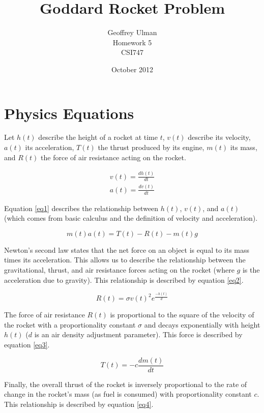 \documentclass{article}
\begin{document}
\title{Goddard Rocket Problem}
\author{Geoffrey Ulman\\
        Homework 5\\
        CSI747}
\date{October 2012}
\maketitle

\section{Physics Equations}\label{Physics Equations}

Let \(h(t)\) describe the height of a rocket at time \(t\), \(v(t)\) describe its velocity, \(a(t)\) its acceleration, \(T(t)\) the thrust produced by its engine, \(m(t)\) its mass, and \(R(t)\) the force of air resistance acting on the rocket.

\begin{eqnarray}\label{eq1}
v(t) = \frac{dh(t)}{dt} \nonumber \\
a(t) = \frac{dv(t)}{dt}
\end{eqnarray}

Equation \ref{eq1} describes the relationship between \(h(t)\), \(v(t)\), and \(a(t)\) (which comes from basic calculus and the definition of velocity and acceleration).

\begin{equation}\label{eq2}
m(t)a(t) = T(t) - R(t) - m(t)g
\end{equation}

Newton's second law states that the net force on an object is equal to its mass times its acceleration. This allows us to describe the relationship between the gravitational, thrust, and air resistance forces acting on the rocket (where \(g\) is the acceleration due to gravity). This relationship is described by equation \ref{eq2}.

\begin{equation}\label{eq3}
R(t) = \sigma v(t)^2 e^{\frac{-h(t)}{d}}
\end{equation}

The force of air resistance \(R(t)\) is proportional to the square of the velocity of the rocket with a proportionality constant \(\sigma\) and decays exponentially with height \(h(t)\) (\(d\) is an air density adjustment parameter). This force is described by equation \ref{eq3}.

\begin{equation}\label{eq4}
T(t) = -c \frac{dm(t)}{dt}
\end{equation}

Finally, the overall thrust of the rocket is inversely proportional to the rate of change in the rocket's mass (as fuel is consumed) with proportionality constant \(c\). This relationship is described by equation \ref{eq4}.
\end{document}
